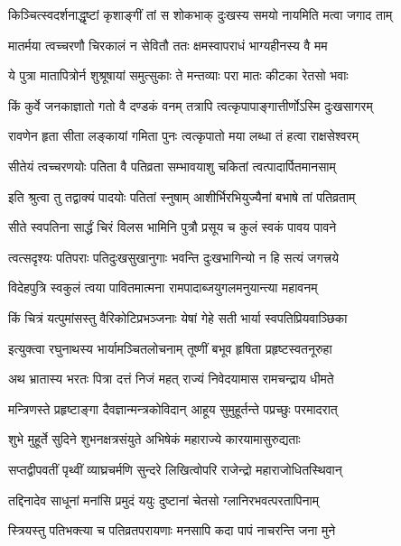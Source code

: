 \twolineshloka
{किञ्चित्स्वदर्शनाद्धृष्टां कृशाङ्गीं तां स शोकभाक्}
{दुःखस्य समयो नायमिति मत्वा जगाद ताम्}%


\twolineshloka
{मातर्मया त्वच्चरणौ चिरकालं न सेवितौ}
{ततः क्षमस्वापराधं भाग्यहीनस्य वै मम}%

\twolineshloka
{ये पुत्रा मातापित्रोर्न शुश्रूषायां समुत्सुकाः}
{ते मन्तव्याः परा मातः कीटका रेतसो भवाः}%

\twolineshloka
{किं कुर्वे जनकाज्ञातो गतो वै दण्डकं वनम्}
{तत्रापि त्वत्कृपापाङ्गात्तीर्णोऽस्मि दुःखसागरम्}%

\twolineshloka
{रावणेन हृता सीता लङ्कायां गमिता पुनः}
{त्वत्कृपातो मया लब्धा तं हत्वा राक्षसेश्वरम्}%

\twolineshloka
{सीतेयं त्वच्चरणयोः पतिता वै पतिव्रता}
{सम्भावयाशु चकितां त्वत्पादार्पितमानसाम्}%

\twolineshloka
{इति श्रुत्वा तु तद्वाक्यं पादयोः पतितां स्नुषाम्}
{आशीर्भिरभियुज्यैनां बभाषे तां पतिव्रताम्}%

\twolineshloka
{सीते स्वपतिना सार्द्धं चिरं विलस भामिनि}
{पुत्रौ प्रसूय च कुलं स्वकं पावय पावने}%

\twolineshloka
{त्वत्सदृश्यः पतिपराः पतिदुःखसुखानुगाः}
{भवन्ति दुःखभागिन्यो न हि सत्यं जगत्त्रये}%

\twolineshloka
{विदेहपुत्रि स्वकुलं त्वया पावितमात्मना}
{रामपादाब्जयुगलमनुयान्त्या महावनम्}%

\twolineshloka
{किं चित्रं यत्पुमांसस्तु वैरिकोटिप्रभञ्जनाः}
{येषां गेहे सती भार्या स्वपतिप्रियवाञ्छिका}%

\twolineshloka
{इत्युक्त्वा रघुनाथस्य भार्यामञ्चितलोचनाम्}
{तूष्णीं बभूव हृषिता प्रहृष्टस्वतनूरुहा}%

\twolineshloka
{अथ भ्रातास्य भरतः पित्रा दत्तं निजं महत्}
{राज्यं निवेदयामास रामचन्द्राय धीमते}%

\twolineshloka
{मन्त्रिणस्ते प्रहृष्टाङ्गा दैवज्ञान्मन्त्रकोविदान्}
{आहूय सुमुहूर्तन्ते पप्रच्छुः परमादरात्}%

\twolineshloka
{शुभे मुहूर्ते सुदिने शुभनक्षत्रसंयुते}
{अभिषेकं महाराज्ये कारयामासुरुद्यताः}%

\twolineshloka
{सप्तद्वीपवतीं पृथ्वीं व्याघ्रचर्मणि सुन्दरे}
{लिखित्वोपरि राजेन्द्रो महाराजोधितस्थिवान्}%

\twolineshloka
{तद्दिनादेव साधूनां मनांसि प्रमुदं ययुः}
{दुष्टानां चेतसो ग्लानिरभवत्परतापिनाम्}%

\twolineshloka
{स्त्रियस्तु पतिभक्त्या च पतिव्रतपरायणाः}
{मनसापि कदा पापं नाचरन्ति जना मुने}%

